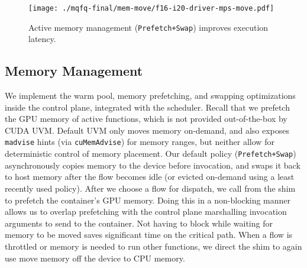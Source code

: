 \begin{figure}
  \texttt{[image: ./mqfq-final/mem-move/f16-i20-driver-mps-move.pdf]}
  \caption{Active memory management (\texttt{Prefetch+Swap}) improves execution latency.}
  \label{fig:mem-prefetch}
\end{figure}

\subsection{Memory Management}

We implement the warm pool, memory prefetching, and swapping optimizations inside the control plane, integrated with the scheduler. 
Recall that we prefetch the GPU memory of active functions, which is not provided out-of-the-box by CUDA UVM. 
Default UVM only moves memory on-demand, and also exposes \texttt{madvise} hints (via \texttt{cuMemAdvise}) for memory ranges, but neither allow for deterministic control of memory placement.
Our default policy (\texttt{Prefetch+Swap}) asynchronously copies memory to the device before invocation, and swaps it back to host memory after the flow becomes idle (or evicted on-demand using a least recently used policy). 
After we choose a flow for dispatch, we call  from the shim to prefetch the container's GPU memory.
Doing this in a non-blocking manner allows us to overlap prefetching with the control plane marshalling invocation arguments to send to the container. 
Not having to block while waiting for memory to be moved saves significant time on the critical path.
When a flow is throttled or memory is needed to run other functions, we direct the shim to again use  move memory off the device to CPU memory. 


